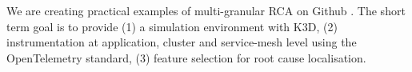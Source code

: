 
We are creating practical examples of multi-granular RCA on Github \cite{Github}. The short term goal is to provide (1) a simulation environment with K3D, (2) instrumentation at application, cluster and service-mesh level using the OpenTelemetry standard, (3) feature selection for root cause localisation.
